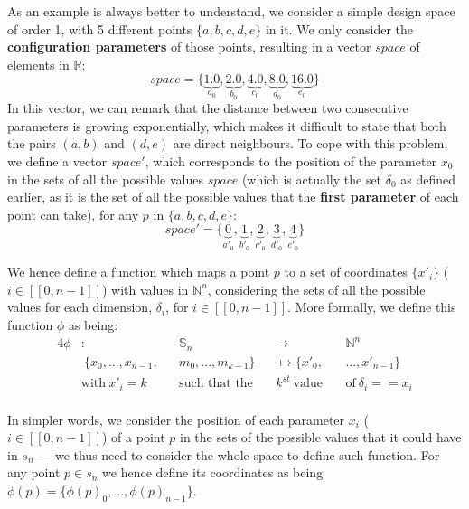         As an example is always better to understand, we consider a simple design space of order 1, with 5 different points $\{a, b, c, d, e\}$ in it.
        We only consider the {\bf configuration parameters} of those points, resulting in a vector $space$ of elements in $\mathbb{R}$:
        \begin{equation}
            \label{ch.dse:sec.functional:ssec.basic:eq.indexExample}
            space = \{\underbrace{1.0}_{a_0}, \underbrace{2.0}_{b_0}, \underbrace{4.0}_{c_0}, \underbrace{8.0}_{d_0}, \underbrace{16.0}_{e_0}\}
        \end{equation}
        In this vector, we can remark that the distance between two consecutive parameters is growing exponentially, which makes it difficult to state that both the pairs $(a, b)$ and $(d, e)$ are direct neighbours.
        To cope with this problem, we define a vector $space'$, which corresponds to the position of the parameter $x_0$ in the sets of all the possible values $space$ (which is actually the set $\delta_0$ as defined earlier, as it is the set of all the possible values that the {\bf first parameter} of each point can take), for any $p$ in $\{a, b, c, d, e\}$:
        \begin{equation}
            \label{ch.dse:sec.functional:ssec.basic:eq.indexExample2}
            space' = \{\underbrace{0}_{a'_0}, \underbrace{1}_{b'_0}, \underbrace{2}_{c'_0}, \underbrace{3}_{d'_0}, \underbrace{4}_{e'_0}\}
        \end{equation}

        We hence define a function which maps a point $p$ to a set of coordinates $\{x'_i\}$ ($i \in [\![0, n-1]\!]$) with values in $\mathbb{N}^n$, considering the sets of all the possible values for each dimension, $\delta_i$, for $i \in [\![0, n-1]\!]$.
        More formally, we define this function $\phi$ as being:
        \begin{alignat*}{4}
            \phi&: &&\mathbb{S}_n &&\rightarrow &&\mathbb{N}^n\\
                &\:\{x_0, ..., x_{n-1}, &&m_0, ..., m_{k-1}\} &&\mapsto \{x'_0, &&..., x'_{n-1}\}\\
                &\text{with}\: x'_i = k &&\text{such that the}\: &&k^{st}\: \text{value}\:&&\text{of}\:\delta_i == x_i  \\
        \end{alignat*}

        In simpler words, we consider the position of each parameter $x_i$ ($i \in [\![0, n-1]\!]$) of a point $p$ in the sets of the possible values that it could have in $s_n$ --- we thus need to consider the whole space to define such function.
        For any point $p \in s_n$ we hence define its coordinates as being $\phi(p) = \{\phi(p)_0, ..., \phi(p)_{n-1}\}$.

